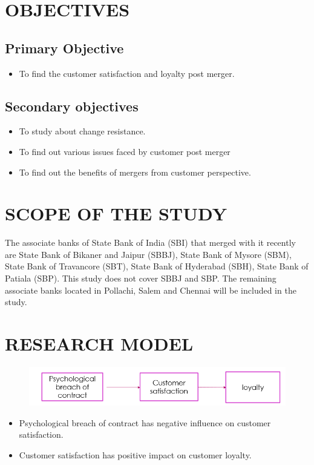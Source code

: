 \documentclass[12pt, a4paper]{article}
\begin{document}
\section*{OBJECTIVES}
\subsection*{Primary Objective}
\begin{itemize}
\item To find the customer satisfaction and loyalty post merger.
\end{itemize}
\subsection*{Secondary objectives}
\begin{itemize}
\item To study about change resistance.
\item To find out various issues faced by customer post merger
\item To find out the benefits of mergers from customer perspective.
\end{itemize}

\section*{SCOPE OF THE STUDY}
The associate banks of State Bank of India (SBI) that merged with it recently are State Bank of Bikaner and Jaipur (SBBJ), State Bank of Mysore (SBM), State Bank of Travancore (SBT),  State Bank of Hyderabad (SBH),  State Bank of Patiala (SBP).
This study does not cover SBBJ and SBP. The remaining associate banks located in Pollachi, Salem and Chennai will be included in the study. 

\section*{RESEARCH MODEL}
\begin{figure}[H]
\centering
\includegraphics[scale=1]{model.png}
\end{figure}
\begin{itemize}
\item Psychological breach of contract has negative influence on customer satisfaction.
\item Customer satisfaction has positive impact on customer loyalty.
\end{itemize}
\end{document}

